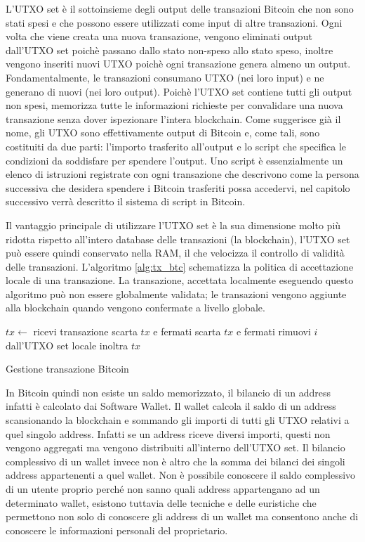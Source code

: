 L'UTXO set è il sottoinsieme degli output delle transazioni Bitcoin che non sono stati spesi e che possono essere utilizzati come input di altre transazioni. Ogni volta che viene creata una nuova transazione, vengono eliminati output dall'UTXO set poichè passano dallo stato non-speso allo stato speso, inoltre vengono inseriti nuovi UTXO poichè ogni transazione genera almeno un output. Fondamentalmente, le transazioni consumano UTXO (nei loro input) e ne generano di nuovi (nei loro output). Poichè l'UTXO set contiene tutti gli output non spesi, memorizza tutte le informazioni richieste per convalidare una nuova transazione senza dover ispezionare l'intera blockchain. Come suggerisce già il nome, gli UTXO sono effettivamente output di Bitcoin e, come tali, sono costituiti da due parti: l'importo trasferito all'output e lo script che specifica le condizioni da soddisfare per spendere l'output. Uno script è essenzialmente un elenco di istruzioni registrate con ogni transazione che descrivono come la persona successiva che desidera spendere i Bitcoin trasferiti possa accedervi, nel capitolo successivo verrà descritto il sistema di script in Bitcoin.

Il vantaggio principale di utilizzare l'UTXO set è la sua dimensione molto più ridotta rispetto all'intero database delle transazioni (la blockchain), l'UTXO set può essere quindi conservato nella RAM, il che velocizza il controllo di validità delle transazioni. L'algoritmo \ref{alg:tx_btc} schematizza la politica di accettazione locale di una transazione. La transazione, accettata localmente eseguendo questo algoritmo può non essere globalmente validata; le transazioni vengono aggiunte alla blockchain quando vengono confermate a livello globale.
\begin{algorithm}
\begin{algorithmic}
\State $tx \gets$ ricevi transazione
        \State scarta $tx$ e fermati
    \EndIf
\EndFor
{}
    \State scarta $tx$ e fermati
\EndIf
{}
    \State rimuovi $i$ dall'UTXO set locale
\EndFor
\State inoltra $tx$
\end{algorithmic}
\caption{Gestione transazione Bitcoin}
\label{alg:tx_btc}
\end{algorithm}
\FloatBarrier
In Bitcoin quindi non esiste un saldo memorizzato, il bilancio di un address infatti è calcolato dai Software Wallet. Il wallet calcola il saldo di un address scansionando la blockchain e sommando gli importi di tutti gli UTXO relativi a quel singolo address. Infatti se un address riceve diversi importi, questi non vengono aggregati ma vengono distribuiti all'interno dell'UTXO set. Il bilancio complessivo di un wallet invece non è altro che la somma dei bilanci dei singoli address appartenenti a quel wallet. 
Non è possibile conoscere il saldo complessivo di un utente proprio perché non sanno quali address appartengano ad un determinato wallet, esistono tuttavia delle tecniche e delle euristiche che permettono non solo di conoscere gli address di un wallet ma consentono anche di conoscere le informazioni personali del proprietario.

